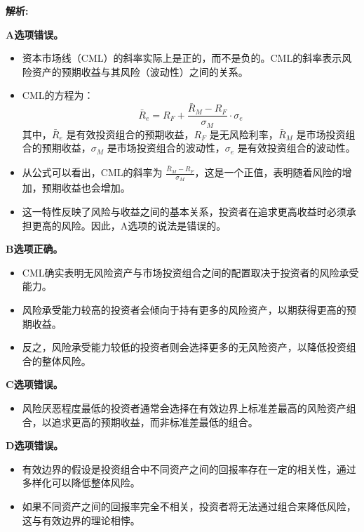 \documentclass{article}
\newenvironment{explanation}
{\textbf{解析:}\par}
{\par}
\begin{document}
\begin{explanation}

    \textbf{A选项错误。}
    \begin{itemize}
        \item 资本市场线（CML）的斜率实际上是正的，而不是负的。CML的斜率表示风险资产的预期收益与其风险（波动性）之间的关系。
        \item CML的方程为：
        \[
        \bar{R}_e = R_F + \frac{\bar{R}_M - R_F}{\sigma_M} \cdot \sigma_e
        \]
        其中，\(\bar{R}_e\) 是有效投资组合的预期收益，\(R_F\) 是无风险利率，\(\bar{R}_M\) 是市场投资组合的预期收益，\(\sigma_M\) 是市场投资组合的波动性，\(\sigma_e\) 是有效投资组合的波动性。
        \item 从公式可以看出，CML的斜率为 \(\frac{\bar{R}_M - R_F}{\sigma_M}\)，这是一个正值，表明随着风险的增加，预期收益也会增加。
        \item 这一特性反映了风险与收益之间的基本关系，投资者在追求更高收益时必须承担更高的风险。因此，A选项的说法是错误的。
    \end{itemize}
    
    \textbf{B选项正确。}
    \begin{itemize}
        \item CML确实表明无风险资产与市场投资组合之间的配置取决于投资者的风险承受能力。
        \item 风险承受能力较高的投资者会倾向于持有更多的风险资产，以期获得更高的预期收益。
        \item 反之，风险承受能力较低的投资者则会选择更多的无风险资产，以降低投资组合的整体风险。
    \end{itemize}
    
    \textbf{C选项错误。}
    \begin{itemize}
        \item 风险厌恶程度最低的投资者通常会选择在有效边界上标准差最高的风险资产组合，以追求更高的预期收益，而非标准差最低的组合。
    \end{itemize}
    
    \textbf{D选项错误。}
    \begin{itemize}
        \item 有效边界的假设是投资组合中不同资产之间的回报率存在一定的相关性，通过多样化可以降低整体风险。
        \item 如果不同资产之间的回报率完全不相关，投资者将无法通过组合来降低风险，这与有效边界的理论相悖。
    \end{itemize}

\end{explanation}
\end{document}
